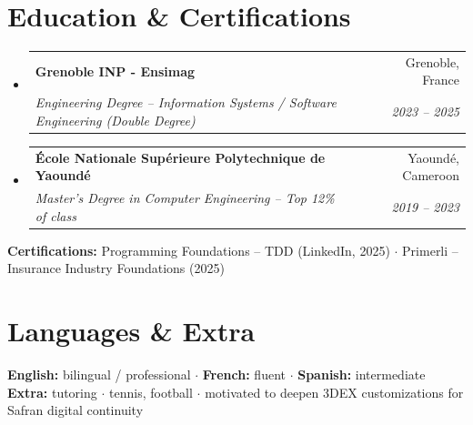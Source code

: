 \documentclass[letterpaper,10.5pt]{article}
\makeatletter
\newcommand{\resumeSubheading}[4]{
  \vspace{-1pt}\item
    \begin{tabular*}{0.97\textwidth}[t]{l@{\extracolsep{\fill}}r}
      \textbf{#1} & #2 \\
      \textit{\small#3} & \textit{\small #4} \\
    \end{tabular*}\vspace{-5pt}
}
\newcommand{\resumeSubHeadingListStart}{\begin{itemize}[leftmargin=0.15in, label={}]}
\newcommand{\resumeSubHeadingListEnd}{\end{itemize}}
\makeatother
\begin{document}
\section{Education \& Certifications}

\resumeSubHeadingListStart
  \resumeSubheading
    {Grenoble INP - Ensimag}{Grenoble, France}
    {Engineering Degree -- Information Systems / Software Engineering (Double Degree)}{2023 -- 2025}
  \resumeSubheading
    {\'Ecole Nationale Sup\'erieure Polytechnique de Yaound\'e}{Yaound\'e, Cameroon}
    {Master's Degree in Computer Engineering -- Top 12\% of class}{2019 -- 2023}
\resumeSubHeadingListEnd
\small{
\textbf{Certifications:} Programming Foundations -- TDD (LinkedIn, 2025) $\cdot$ Primerli -- Insurance Industry Foundations (2025)
}

\section{Languages \& Extra}
\small{
\textbf{English:} bilingual / professional $\cdot$ \textbf{French:} fluent $\cdot$ \textbf{Spanish:} intermediate \\
\textbf{Extra:} tutoring $\cdot$ tennis, football $\cdot$ motivated to deepen 3DEX customizations for Safran digital continuity
}
\end{document}
